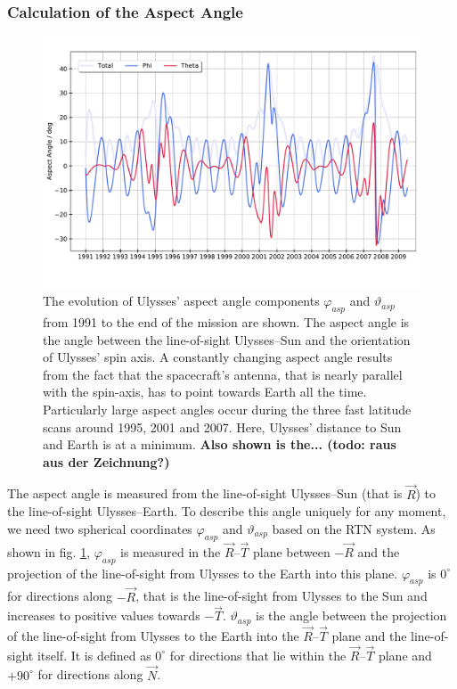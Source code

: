 \subsubsection{Calculation of the Aspect Angle}
\begin{figure}[h]
	\includegraphics[width=1\textwidth]{Figures/aa_new.pdf}
	\centering
	\caption{The evolution of Ulysses' aspect angle components $\varphi_{asp}$ and $\vartheta_{asp}$ from 1991 to the end of the mission are shown. The aspect angle is the angle between the line-of-sight Ulysses--Sun and the orientation of Ulysses' spin axis. A constantly changing aspect angle results from the fact that the spacecraft's antenna, that is nearly parallel with the spin-axis, has to point towards Earth all the time. Particularly large aspect angles occur during the three fast latitude scans around 1995, 2001 and 2007. Here, Ulysses' distance to Sun and Earth is at a minimum. \textbf{Also shown is the... (todo: raus aus der Zeichnung?)} }
	\label{fig:aa}
\end{figure}
The aspect angle is measured from the line-of-sight Ulysses--Sun (that is $\vec{R}$) to the line-of-sight Ulysses--Earth. To describe this angle uniquely for any moment, we need two spherical coordinates $\varphi_{asp}$ and $\vartheta_{asp}$ based on the RTN system. As shown in fig. \ref{fig:aa}, $\varphi_{asp}$ is measured in the $\vec{R}$--$\vec{T}$ plane between $-\vec{R}$ and the projection of the line-of-sight from Ulysses to the Earth into this plane. $\varphi_{asp}$  is $0^\circ$ for directions along $-\vec{R}$, that is the line-of-sight from Ulysses to the Sun and increases to positive values towards $-\vec{T}$. $\vartheta_{asp}$ is the angle between the projection of the line-of-sight from Ulysses to the Earth into the $\vec{R}$--$\vec{T}$ plane and the line-of-sight itself. It is defined as $0^\circ$ for directions that lie within the $\vec{R}$--$\vec{T}$ plane and $+90^\circ$ for directions along $\vec{N}$.\\
